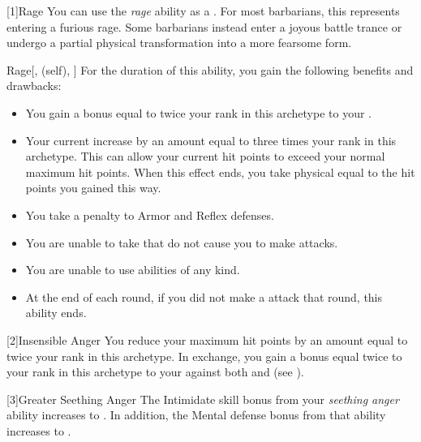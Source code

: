         [1]{Rage} You can use the \textit{rage} ability as a .
        For most barbarians, this represents entering a furious rage.
        Some barbarians instead enter a joyous battle trance or undergo a partial physical transformation into a more fearsome form.
        \begin{attuneability}{Rage}[,  (self), ]
            For the duration of this ability, you gain the following benefits and drawbacks:
            \begin{itemize}
                \item You gain a bonus equal to twice your rank in this archetype to your  .
                \item Your current  increase by an amount equal to three times your rank in this archetype.
                    This can allow your current hit points to exceed your normal maximum hit points.
                    When this effect ends, you take physical  equal to the hit points you gained this way.
                \item You take a  penalty to Armor and Reflex defenses.
                \item You are unable to take  that do not cause you to make  attacks.
                \item You are unable to use  abilities of any kind.
                \item At the end of each round, if you did not make a  attack that round, this ability ends.
            \end{itemize}
        \end{attuneability}

        [2]{Insensible Anger} You reduce your maximum hit points by an amount equal to twice your rank in this archetype.
        In exchange, you gain a bonus equal twice to your rank in this archetype to your  against both  and  (see ).

        [3]{Greater Seething Anger} The Intimidate skill bonus from your \textit{seething anger} ability increases to .
        In addition, the Mental defense bonus from that ability increases to .

